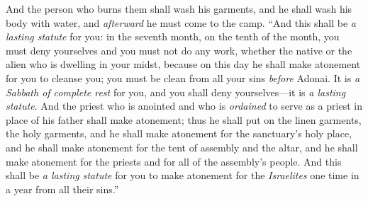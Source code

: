 \begin{biblechapter}
\verse And the person who burns them shall wash his garments, and he shall wash his body with water, and \textit{afterward} he must come to the camp.
\verse “And this shall be \textit{a lasting statute} for you: in the seventh month, on the tenth of the month, you must deny yourselves and you must not do any work, whether the native or the alien who is dwelling in your midst,
\verse because on this day he shall make atonement for you to cleanse you; you must be clean from all your sins \textit{before} Adonai.
\verse It is \textit{a Sabbath of complete rest} for you, and you shall deny yourselves—it is \textit{a lasting statute}.
\verse And the priest who is anointed and who is \textit{ordained} to serve as a priest in place of his father shall make atonement; thus he shall put on the linen garments, the holy garments,
\verse and he shall make atonement for the sanctuary’s holy place, and he shall make atonement for the tent of assembly and the altar, and he shall make atonement for the priests and for all of the assembly’s people.
\verse And this shall be \textit{a lasting statute} for you to make atonement for the \textit{Israelites} one time in a year from all their sins.”
\end{biblechapter}

